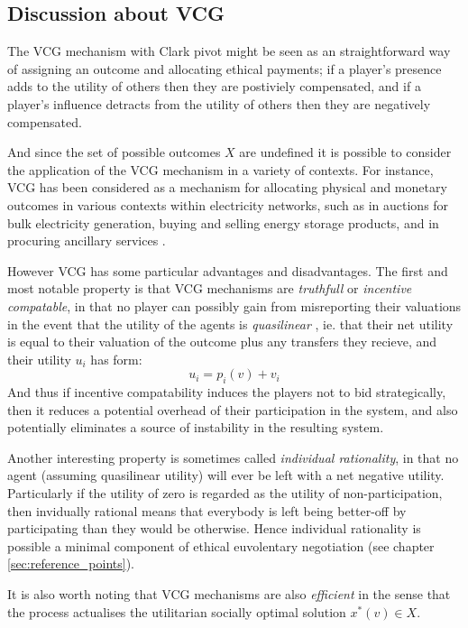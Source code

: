 \subsection{Discussion about VCG}
The VCG mechanism with Clark pivot might be seen as an straightforward way of assigning an outcome and allocating ethical payments; if a player's presence adds to the utility of others then they are postiviely compensated, and if a player's influence detracts from the utility of others then they are negatively compensated.

And since the set of possible outcomes $X$ are undefined it is possible to consider the application of the VCG mechanism in a variety of contexts.	
For instance, VCG has been considered as a mechanism for allocating physical and monetary outcomes in various contexts within electricity networks, such as in auctions for bulk electricity generation, buying and selling energy storage products, and in procuring ancillary services \cite{FABRA200272, SESSA2017189, 8264596, 7512339}.

However VCG has some particular advantages and disadvantages.
The first and most notable property is that VCG mechanisms are \textit{truthfull} or \textit{incentive compatable}, in that no player can possibly gain from misreporting their valuations
in the event that the utility of the agents is \textit{quasilinear} \cite{roberts1979characterization, Lavi2008}, ie. that their net utility is equal to their valuation of the outcome plus any transfers they recieve, and their utility $u_i$ has form:
$$ u_i = p_i(v)+v_i $$
And thus if incentive compatability induces the players not to bid strategically, then it reduces a potential overhead of their participation in the system, and also potentially eliminates a source of instability in the resulting system.

Another interesting property is sometimes called \textit{individual rationality}, in that no agent (assuming quasilinear utility) will ever be left with a net negative utility. Particularly if the utility of zero is regarded as the utility of non-participation, then invidually rational means that everybody is left being better-off by participating than they would be otherwise. Hence individual rationality is possible a minimal component of ethical euvolentary negotiation (see chapter \ref{sec:reference_points}).

It is also worth noting that VCG mechanisms are also \textit{efficient} in the sense that the process actualises the utilitarian socially optimal solution $x^*(v) \in X$.

